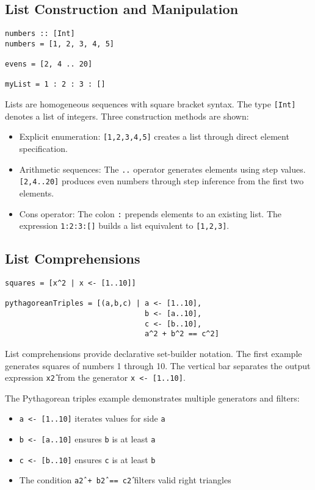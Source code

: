 \documentclass{book}
\begin{document}
\subsection{List Construction and Manipulation}
\begin{lstlisting}
numbers :: [Int]
numbers = [1, 2, 3, 4, 5]

evens = [2, 4 .. 20]

myList = 1 : 2 : 3 : []
\end{lstlisting}

Lists are homogeneous sequences with square bracket syntax. The type \texttt{[Int]} denotes a list of integers. Three construction methods are shown:

\begin{itemize}
\item Explicit enumeration: \texttt{[1,2,3,4,5]} creates a list through direct element specification.

\item Arithmetic sequences: The \texttt{..} operator generates elements using step values. \texttt{[2,4..20]} produces even numbers through step inference from the first two elements.

\item Cons operator: The colon \texttt{:} prepends elements to an existing list. The expression \texttt{1:2:3:[]} builds a list equivalent to \texttt{[1,2,3]}.
\end{itemize}

\subsection{List Comprehensions}
\begin{lstlisting}
squares = [x^2 | x <- [1..10]]

pythagoreanTriples = [(a,b,c) | a <- [1..10],
                                b <- [a..10],
                                c <- [b..10],
                                a^2 + b^2 == c^2]
\end{lstlisting}

List comprehensions provide declarative set-builder notation. The first example generates squares of numbers 1 through 10. The vertical bar separates the output expression \texttt{x\^2} from the generator \texttt{x <- [1..10]}.

The Pythagorean triples example demonstrates multiple generators and filters:
\begin{itemize}
\item \texttt{a <- [1..10]} iterates values for side \texttt{a}
\item \texttt{b <- [a..10]} ensures \texttt{b} is at least \texttt{a}
\item \texttt{c <- [b..10]} ensures \texttt{c} is at least \texttt{b}
\item The condition \texttt{a\^2 + b\^2 == c\^2} filters valid right triangles
\end{itemize}
\end{document}
